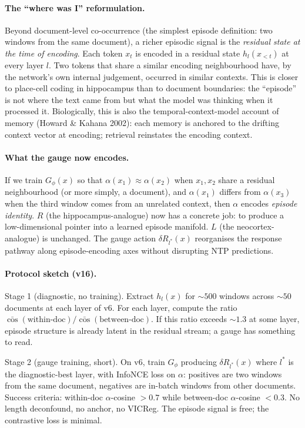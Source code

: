 \documentclass[11pt, a4paper]{article}
\theoremstyle{plain}
\theoremstyle{definition}
\theoremstyle{remark}
\begin{document}
\paragraph{The ``where was I'' reformulation.}
Beyond document-level co-occurrence (the simplest episode definition: two windows from the same document), a richer episodic signal is the \emph{residual state at the time of encoding}.
Each token $x_t$ is encoded in a residual state $h_l(x_{<t})$ at every layer $l$.
Two tokens that share a similar encoding neighbourhood have, by the network's own internal judgement, occurred in similar contexts.
This is closer to place-cell coding in hippocampus than to document boundaries: the ``episode'' is not where the text came from but what the model was thinking when it processed it.
Biologically, this is also the temporal-context-model account of memory (Howard \& Kahana 2002): each memory is anchored to the drifting context vector at encoding; retrieval reinstates the encoding context.

\paragraph{What the gauge now encodes.}
If we train $G_\phi(x)$ so that $\alpha(x_1) \approx \alpha(x_2)$ when $x_1, x_2$ share a residual neighbourhood (or more simply, a document), and $\alpha(x_1)$ differs from $\alpha(x_3)$ when the third window comes from an unrelated context, then $\alpha$ encodes \emph{episode identity}.
$R$ (the hippocampus-analogue) now has a concrete job: to produce a low-dimensional pointer into a learned episode manifold.
$L$ (the neocortex-analogue) is unchanged.
The gauge action $\delta R_{l^*}(x)$ reorganises the response pathway along episode-encoding axes without disrupting NTP predictions.

\paragraph{Protocol sketch (v16).}
Stage 1 (diagnostic, no training).
Extract $h_{l}(x)$ for $\sim 500$ windows across $\sim 50$ documents at each layer of v6.
For each layer, compute the ratio $\bar{\cos}(\mathrm{within\text{-}doc}) / \bar{\cos}(\mathrm{between\text{-}doc})$.
If this ratio exceeds $\sim 1.3$ at some layer, episode structure is already latent in the residual stream; a gauge has something to read.

Stage 2 (gauge training, short).
On v6, train $G_\phi$ producing $\delta R_{l^*}(x)$ where $l^*$ is the diagnostic-best layer, with InfoNCE loss on $\alpha$: positives are two windows from the same document, negatives are in-batch windows from other documents.
Success criteria: within-doc $\alpha$-cosine $> 0.7$ while between-doc $\alpha$-cosine $< 0.3$.
No length deconfound, no anchor, no VICReg.
The episode signal is free; the contrastive loss is minimal.
\end{document}
